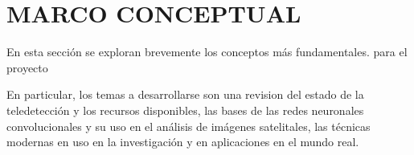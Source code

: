 \section{MARCO CONCEPTUAL}

En esta sección se exploran brevemente los conceptos más fundamentales. para el proyecto

En particular, los temas a desarrollarse son una revision del estado de la teledetección y los recursos disponibles, las
bases de las redes neuronales convolucionales y su uso en el análisis de imágenes satelitales, las técnicas modernas en
uso en la investigación y en aplicaciones en el mundo real.






